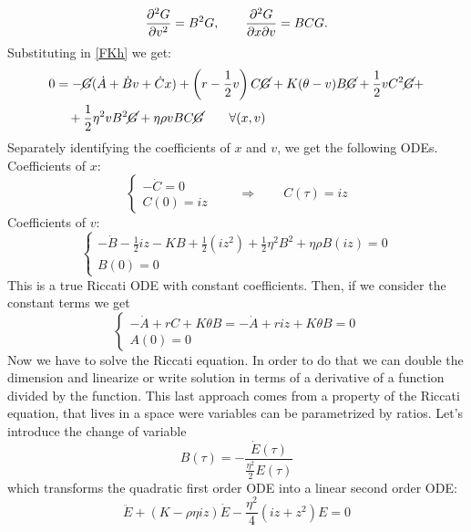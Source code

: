 \begin{align*}
    \pdv[2]{G}{v} = B^2G, \qquad \pdv{G}{x}{v} = BCG.
\end{align*}
Substituting in \eqref{FKh} we get:
\begin{align}
    \notag 0 &= -\cancel{G}(\dot{A}+\dot{B}v+\dot{C}x) + \left(r-\frac{1}{2}v\right)C\cancel{G} + K(\theta-v)B\cancel{G} + \frac{1}{2}vC^2\cancel{G} + \\
    &\quad + \frac{1}{2}\eta^2vB^2\cancel{G} + \eta\rho v BC\cancel{G} \qquad \forall(x,v)
\end{align}
Separately identifying the coefficients of $x$ and $v$, we get the following ODEs. Coefficients of $x$:
\begin{equation*}
    \begin{cases}
    -\dot{C} = 0 \\
    C(0) = iz
    \end{cases} \qquad \Rightarrow \qquad C(\tau) = iz
\end{equation*}
Coefficients of $v$:
\begin{equation*}
    \begin{cases}
    -\dot{B} -\frac{1}{2}iz - KB + \frac{1}{2}(iz^2) + \frac{1}{2}\eta^2B^2 + \eta\rho B(iz) = 0 \\
    B(0) = 0
    \end{cases}
\end{equation*}
This is a true Riccati ODE with constant coefficients. Then, if we consider the constant terms we get
\begin{equation*}
    \begin{cases}
    -\dot{A} + rC + K\theta B = -\dot{A} + riz + K\theta B = 0 \\
    A(0) = 0
    \end{cases}
\end{equation*}
Now we have to solve the Riccati equation. In order to do that we can double the dimension and linearize or write solution in terms of a derivative of a function divided by the function. This last approach comes from a property of the Riccati equation, that lives in a space were variables can be parametrized by ratios. Let's introduce the change of variable
\begin{equation}
    B(\tau) = - \frac{\dot{E}(\tau)}{\tfrac{\eta^2}{2}E(\tau)}
\end{equation}
which transforms the quadratic first order ODE into a linear second order ODE:
\begin{equation*}
    \ddot{E} + (K-\rho\eta iz)\dot{E} - \frac{\eta^2}{4}(iz+z^2)E = 0
\end{equation*}
